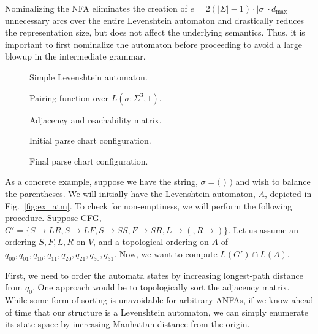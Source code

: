 \documentclass[sigplan,review,acmsmall,nonacm,screen,anonymous]{acmart}\settopmatter{printfolios=false,printccs=false,printacmref=false}
\begin{document}
Nominalizing the NFA eliminates the creation of $e=2(|\Sigma| - 1)\cdot|\sigma|\cdot d_\max$ unnecessary arcs over the entire Levenshtein automaton and drastically reduces the representation size, but does not affect the underlying semantics. Thus, it is important to first nominalize the automaton before proceeding to avoid a large blowup in the intermediate grammar.

\begin{wrapfigure}{r}{0.40\textwidth}
\vspace{-0.2cm}
\resizebox{0.4\textwidth}{!}{%

}
\caption{Simple Levenshtein automaton.}\label{fig:ex_atm}

\vspace{0.3cm}
\resizebox{0.4\textwidth}{!}{%

}
\caption{Pairing function over $L(\sigma: \Sigma^3, 1)$.}\label{fig:pairing_fun}

\vspace{0.3cm}
\begin{center}
\resizebox{0.35\textwidth}{!}{%

}
\end{center}
\caption{Adjacency and reachability matrix.}\label{fig:reach_matr}

\vspace{0.3cm}
\resizebox{0.4\textwidth}{!}{

}
\caption{Initial parse chart configuration.}\label{fig:initial_pc}

\vspace{0.3cm}
\resizebox{0.4\textwidth}{!}{

}

\caption{Final parse chart configuration.}\label{fig:final_pc}
\end{wrapfigure}

As a concrete example, suppose we have the string, $\sigma=\texttt{( ) )}$ and wish to balance the parentheses. We will initially have the Levenshtein automaton, $A$, depicted in Fig.~\ref{fig:ex_atm}. To check for non-emptiness, we will perform the following procedure. Suppose CFG, $G'= \{S \rightarrow L R, S \rightarrow L F, S \rightarrow S S, F \rightarrow S R, L \rightarrow (, R \rightarrow )\}$. Let us assume an ordering $S, F, L, R$ on $V$, and a topological ordering on $A$ of $q_{00}, q_{01}, q_{10}, q_{11}, q_{20}, q_{21}, q_{30}, q_{31}$. Now, we want to compute $L(G')\cap L(A)$.

First, we need to order the automata states by increasing longest-path distance from $q_0$. One approach would be to topologically sort the adjacency matrix. While some form of sorting is unavoidable for arbitrary ANFAs, if we know ahead of time that our structure is a Levenshtein automaton, we can simply enumerate its state space by increasing Manhattan distance from the origin.%
\end{document}
